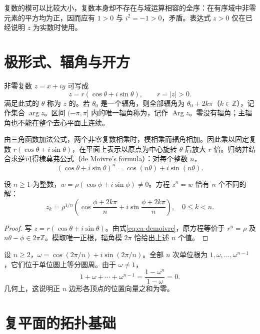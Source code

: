 \documentclass[UTF8,12pt,a4paper,fontset=fandol]{ctexbook}
\begin{document}
复数的模可以比较大小，复数本身却不存在与域运算相容的全序：在有序域中非零元素的平方均为正，因而应有 $1>0$ 与 $i^2=-1>0$，矛盾。表达式 $z>0$ 仅在已经说明 $z$ 为实数时使用。

\section{极形式、辐角与开方}

非零复数 $z=x+iy$ 可写成
\[
 z=r(\cos\theta+i\sin\theta),\qquad r=|z|>0.
\]
满足此式的 $\theta$ 称为 $z$ 的。若 $\theta_0$ 是一个辐角，则全部辐角为 $\theta_0+2k\pi$（$k\in\mathbb{Z}$），记作集合 $\arg z$。区间 $(-\pi,\pi]$ 内的唯一辐角称为，记作 $\operatorname{Arg}z$。零没有辐角；主辐角也不能在整个去心平面上连续。

由三角函数加法公式，两个非零复数相乘时，模相乘而辐角相加。因此乘以固定复数 $r(\cos\theta+i\sin\theta)$，在平面上表示以原点为中心旋转 $\theta$ 后放大 $r$ 倍。归纳并结合求逆可得棣莫弗公式（de Moivre's formula）：对每个整数 $n$，
\begin{equation}
 (\cos\theta+i\sin\theta)^n=\cos(n\theta)+i\sin(n\theta).
 \label{eq:ca-demoivre}
\end{equation}

\begin{proposition}[复数开方]
设 $n\ge1$ 为整数，$w=\rho(\cos\phi+i\sin\phi)\ne0$。方程 $z^n=w$ 恰有 $n$ 个不同的解：
\begin{equation}
 z_k=\rho^{1/n}\left(\cos\frac{\phi+2k\pi}{n}
       +i\sin\frac{\phi+2k\pi}{n}\right),\quad 0\le k<n.
 \label{eq:ca-roots}
\end{equation}
\end{proposition}
\begin{proof}
写 $z=r(\cos\theta+i\sin\theta)$。由式\eqref{eq:ca-demoivre}，原方程等价于 $r^n=\rho$ 及 $n\theta-\phi\in2\pi\mathbb{Z}$。模取唯一正根，辐角模 $2\pi$ 恰给出上述 $n$ 个值。
\end{proof}

\begin{example}[单位根之和]
设 $n\ge2$，$\omega=\cos(2\pi/n)+i\sin(2\pi/n)$。全部 $n$ 次单位根为 $1,\omega,\ldots,\omega^{n-1}$，它们位于单位圆上等分圆周。由于 $\omega\ne1$，
\[
 1+\omega+\cdots+\omega^{n-1}=\frac{1-\omega^n}{1-\omega}=0.
\]
几何上，这说明正 $n$ 边形各顶点的位置向量之和为零。
\end{example}

\section{复平面的拓扑基础}
\end{document}
